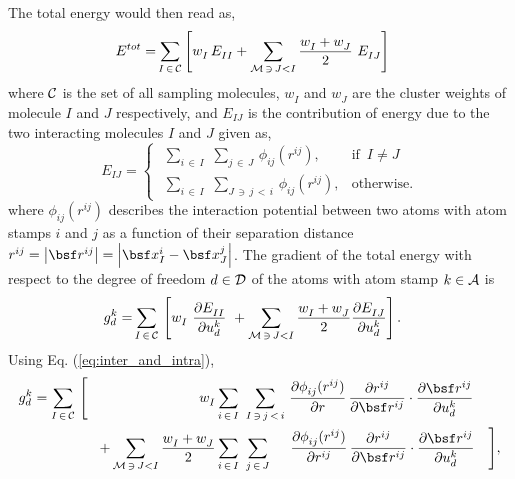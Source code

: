 \documentclass[a4paper,10pt]{article}
\newcommand{\refeq}[1]{Eq. (\ref{eq:#1})}
\newcommand{\norm}[1]{\left\lvert #1 \right\rvert}
\def\mcl  #1{               {\cal #1}}
\begin{document}
The total energy would then read as,
\begin{align}
 E^{tot} = &\sum_{I \, \in \, \mcl C}
            \left[
		  w^{}_I \,
		  E^{}_{II} +
		  \sum_{\mcl M \, \ni \, J < I}
		  \frac{w^{}_I + w^{}_J}{2} \,\,
                  E^{}_{IJ} 
            \right]
\end{align}
where $\mcl C$ is the set of all sampling molecules, $w^{}_I$ and $w^{}_J$ are 
the cluster weights of molecule $I$ and $J$ respectively, and $E^{}_{IJ}$ is 
the contribution of energy due to the two interacting molecules $I$ and $J$ 
given as,
\begin{equation}
 E^{}_{IJ} =  \begin{cases}                   \,\,
               \sum\limits_{i \, \in \, I}    \,\,
               \sum\limits_{j \, \in \, J}    \,
		\phi^{}_{ij}(r^{ij}),
		& \text{if } \,  I \neq J \\[1em] \,\,

               \sum\limits_{i \, \in \, I}    \,\,
               \sum\limits_{J \, \ni \, j \, < \, i} \,
               \phi^{}_{ij}(r^{ij}), 
               & \text{otherwise}.
              \end{cases}
\label{eq:inter_and_intra}
\end{equation}
where $\phi^{}_{ij}(r^{ij})$ describes the interaction potential between two 
atoms with atom stamps $i$ and $j$ as a function of their separation distance 
$r^{ij} = \norm{\bsf r^{ij}} = \norm{ \bsf x^{i}_{I} - \bsf x^{j}_{J} }$. 
The gradient of the total energy with respect to the degree of freedom $d \in 
\mcl D$ of the atoms with atom stamp $k \in \mcl A$ is
\begin{align}
 g^k_d = &\sum_{I \, \in \, \mcl C}  \,
	  \left[
	        w^{}_I \,\,
		\frac{\partial E^{}_{II}}{\partial u^k_d}
		\,\,
		+
		\sum_{\mcl M \, \ni \, J < I}
		\frac{w^{}_I + w^{}_J}{2}
		\frac{\partial E^{}_{IJ}}{\partial u^k_d}
	   \right].
\end{align}
Using \refeq{inter_and_intra},
\begin{align}
 g^k_d = \sum_{I \, \in \, \mcl C}  \,
          \Bigg[
            \,\,\,\,\,\,\,\,\,\,\,\,
            \,\,\,\,\,\,\,\,\,\,\,\,
            \,\,\,\,\,\,\,\,\,\,\,\,
            \,\,\,\,\,\,\,\,\,\,\,\,
            w^{}_I
            &
	    \sum_{i \, \in \, I}                          \,\,
	    \sum_{I \, \ni \, j \, < \, i}                \,
               \frac{\partial \phi^{}_{ij}(r^{ij})}{\partial r} \, 
               \frac{\partial r^{ij}}{\partial \bsf r^{ij}} \cdot
               \frac{\partial \bsf r^{ij}}{\partial u^k_d}     \\
	    +
	    \sum_{\mcl M \, \ni \, J < I}
	    \frac{w^{}_I + w^{}_J}{2}
	    &
            \sum_{i \, \in \, I}           \,\,
	    \sum_{j \, \in \, J}           \,\,\,\,\,\,\,\,
                 \frac{\partial \phi^{}_{ij}(r^{ij})}{\partial r^{ij}} \, 
                 \frac{\partial r^{ij}}{\partial \bsf r^{ij}} \cdot
                 \frac{\partial \bsf r^{ij}}{\partial u^k_d}
	    \,\,\,\,\,\,
           \Bigg],
\end{align}
\end{document}
